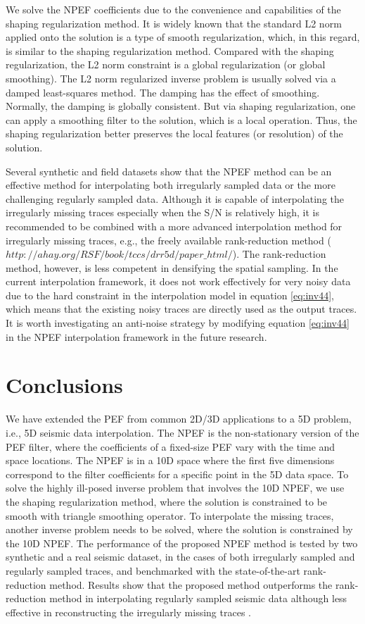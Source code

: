 We solve the NPEF coefficients due to the convenience and capabilities of the shaping regularization method. It is widely known that the standard L2 norm applied onto the solution is a type of smooth regularization, which, in this regard, is similar to the shaping regularization method. Compared with the shaping regularization, the L2 norm constraint is a global regularization (or global smoothing). The L2 norm regularized inverse problem is usually solved via a damped least-squares method. The damping has the effect of smoothing. Normally, the damping is globally consistent. But via shaping regularization, one can apply a smoothing filter to the solution, which is a local operation. Thus, the shaping regularization better preserves the local features (or resolution) of the solution.

Several synthetic and field datasets show that the NPEF method can be an effective method for interpolating both irregularly sampled data or the more challenging regularly sampled data. Although it is capable of interpolating the irregularly missing traces especially when the S/N is relatively high, it is recommended to be combined with a more advanced interpolation method for irregularly missing traces, e.g., the freely available rank-reduction method ($http://ahay.org/RSF/book/tccs/drr5d/paper\_html/$). The rank-reduction method, however, is less competent in densifying the spatial sampling. In the current interpolation framework, it does not work effectively for very noisy data due to the hard constraint in the interpolation model in equation \ref{eq:inv44}, which means that the existing noisy traces are directly used as the output traces. It is worth investigating an anti-noise strategy by modifying equation \ref{eq:inv44} in the NPEF interpolation framework in the future research.  


\section{Conclusions}
We have extended the PEF from common 2D/3D applications to a 5D problem, i.e., 5D seismic data interpolation. The NPEF is the non-stationary version of the PEF filter, where the coefficients of a fixed-size PEF vary with the time and space locations. The NPEF is in a 10D space where the first five dimensions correspond to the filter coefficients for a specific point in the 5D data space. To solve the highly ill-posed inverse problem that involves the 10D NPEF, we use the  shaping regularization method, where the solution is constrained to be smooth with  triangle smoothing operator. To interpolate the missing traces, another inverse problem needs to be solved, where the solution is constrained by the 10D NPEF. The performance of the proposed NPEF method is tested by two synthetic and a real seismic dataset, in the cases of both irregularly sampled and regularly sampled traces, and benchmarked with the state-of-the-art rank-reduction method. Results show that the proposed method outperforms the rank-reduction method in interpolating regularly sampled seismic data although  less effective in reconstructing the irregularly missing traces .

